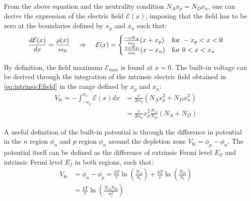 		From the above equation and the neutrality condition $N_A x_p = N_D x_n$, one can derive the expression of the electric field $\mathcal{E}(x)$, imposing that the field has to be zero at the boundaries defined by $x_p$ and $x_n$ such that: 
		\begin{equation}
			\frac{d\mathcal{E}(x)}{dx} = \frac{\rho(x)}{\epsilon \epsilon_0} \hspace{4mm} \Rightarrow \hspace{4mm} \mathcal{E}(x) = 
			\begin{cases}
				\frac{-eN_A}{\epsilon \epsilon_0} (x + x_p) & \text{for } -x_p < x < 0 \\
				\frac{+eN_D}{\epsilon \epsilon_0} (x - x_n) & \text{for } 0 < x < x_n
			\end{cases}
			\label{eq:intrinsicEfield}
		\end{equation}

		By definition, the field maximum $\mathcal{E}_{max}$ is found at $x=0$. The built-in voltage can be derived through the integration of the intrinsic electric field obtained in \eqref{eq:intrinsicEfield} in the range defined by $x_p$ and $x_n$: 
		\begin{equation}
			\begin{split}
				V_{bi} = - \int_{-x_p}^{x_n} \mathcal{E}(x)dx &= \frac{e}{2 \epsilon \epsilon_0} (N_A x_p^2 + N_D x_n^2) \\
																											&= \frac{e}{2 \epsilon \epsilon_0} x_p^2 \frac{N_A}{N_D}(N_A + N_D)
			\end{split}
		\end{equation} 
		
		A useful definition of the built-in potential is through the difference in potential in the $n$ region $\phi_n$ and $p$ region $\phi_n$ around the depletion zone $V_{bi} = \phi_p - \phi_n$. The potential itself can be defined as the difference of extrinsic Fermi level $E_F$ and intrinsic Fermi level $E_f$ in both regions, such that:		 
		\begin{equation}
			\begin{split}
				V_{bi}  &= \phi_n - \phi_p = \frac{kT}{e}\ln(\frac{N_A}{n_i}) +\frac{kT}{e}\ln(\frac{N_D}{n_i})\\
								&=  \frac{kT}{e}\ln(\frac{N_A N_D}{n_i^2})
			\end{split}
			\label{eq:built-inpot}
		\end{equation} 

